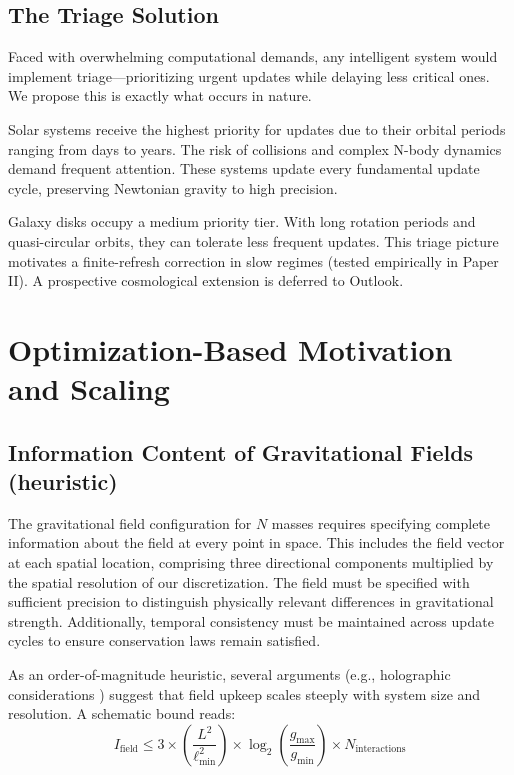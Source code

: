 \documentclass[usenatbib]{mnras}
\begin{document}
\subsection{The Triage Solution}

Faced with overwhelming computational demands, any intelligent system would implement triage---prioritizing urgent updates while delaying less critical ones. We propose this is exactly what occurs in nature.

Solar systems receive the highest priority for updates due to their orbital periods ranging from days to years. The risk of collisions and complex N-body dynamics demand frequent attention. These systems update every fundamental update cycle, preserving Newtonian gravity to high precision.

Galaxy disks occupy a medium priority tier. With long rotation periods and quasi-circular orbits, they can tolerate less frequent updates. This triage picture motivates a finite-refresh correction in slow regimes (tested empirically in Paper II). A prospective cosmological extension is deferred to Outlook.

\section{Optimization-Based Motivation and Scaling}
\label{sec:derivation}

\subsection{Information Content of Gravitational Fields (heuristic)}

The gravitational field configuration for $N$ masses requires specifying complete information about the field at every point in space. This includes the field vector at each spatial location, comprising three directional components multiplied by the spatial resolution of our discretization. The field must be specified with sufficient precision to distinguish physically relevant differences in gravitational strength. Additionally, temporal consistency must be maintained across update cycles to ensure conservation laws remain satisfied.

As an order-of-magnitude heuristic, several arguments (e.g., holographic considerations \citep{bekenstein1973, thooft1993}) suggest that field upkeep scales steeply with system size and resolution. A schematic bound reads:
\begin{equation}
I_{\text{field}} \leq 3 \times \left(\frac{L^2}{\ell_{\text{min}}^2}\right) \times \log_2\left(\frac{g_{\text{max}}}{g_{\text{min}}}\right) \times N_{\text{interactions}}
\end{equation}
\end{document}
